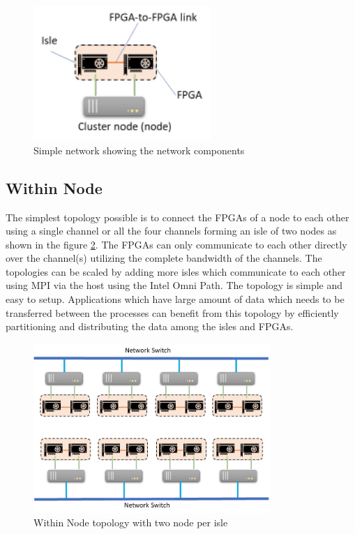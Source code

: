 \begin{figure}[h]%
    \centering
    \includegraphics[width=0.6\textwidth]{images/simple_network}
    \caption{Simple network showing the network components}
    \label{fig:simple_network}
\end{figure}


\subsection{Within Node}
\label{sec:within_node}

The simplest topology possible is to connect the FPGAs of a node to each other
using a single channel or all the four channels forming an isle of two nodes as
shown in the figure \ref{fig:within_node}. The FPGAs can only communicate to
each other directly over the channel(s) utilizing the complete bandwidth of the
channels. The topologies can be scaled by adding more isles which communicate
to each other using MPI via the host using the Intel Omni Path. The topology
is simple and easy to setup. Applications which have large amount of data which
needs to be transferred between the processes can benefit from this topology by
efficiently partitioning and distributing the data among the isles and FPGAs.

\begin{figure}[h]%
    \centering
    \includegraphics[width=0.8\textwidth]{images/within_node}
    \caption{Within Node topology with two node per isle}
    \label{fig:within_node}
\end{figure}

